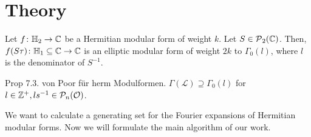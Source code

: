 
\section{Theory}


\begin{lemma}
Let $f \colon \mathbb{H}_2 \rightarrow \mathbb{C}$ be a Hermitian modular form of weight $k$. Let $S \in \operatorname{\mathcal{P}}_2(\mathbb{C})$.
Then, $f(S \tau) \colon \mathbb{H}_1 \subseteq \mathbb{C} \rightarrow \mathbb{C}$ is an elliptic modular form of weight $2k$ to $\Gamma_0(l)$, where $l$ is the denominator of $S^{-1}$.  %
\end{lemma}


\begin{lemma}
Prop 7.3. von Poor für herm Modulformen.
$\Gamma(\mathcal{L}) \supseteq \Gamma_0(l)$ for $l \in \mathbb{Z}^+, ls^{-1} \in \mathcal{P}_n(\mathcal{O})$.
\end{lemma}


We want to calculate a generating set for the Fourier expansions of Hermitian modular forms. Now we will formulate the main algorithm of our work.


